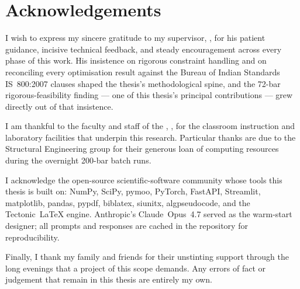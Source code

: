 \chapter*{Acknowledgements}

I wish to express my sincere gratitude to my supervisor,
\thesisguide, for his patient guidance, incisive technical
feedback, and steady encouragement across every phase of this
work. His insistence on rigorous constraint handling and on
reconciling every optimisation result against the Bureau of
Indian Standards IS~800:2007 clauses shaped the thesis's
methodological spine, and the 72-bar rigorous-feasibility
finding --- one of this thesis's principal contributions ---
grew directly out of that insistence.

I am thankful to the faculty and staff of the
\thesisdepartment, \thesisinstitute, for the classroom
instruction and laboratory facilities that underpin this
research. Particular thanks are due to the Structural
Engineering group for their generous loan of computing
resources during the overnight 200-bar batch runs.

I acknowledge the open-source scientific-software community
whose tools this thesis is built on: NumPy, SciPy, pymoo,
PyTorch, FastAPI, Streamlit, matplotlib, pandas, pypdf,
biblatex, siunitx, algpseudocode, and the Tectonic~LaTeX
engine. Anthropic's Claude~Opus~4.7 served as the warm-start
designer; all prompts and responses are cached in the
repository for reproducibility.

Finally, I thank my family and friends for their unstinting
support through the long evenings that a project of this scope
demands. Any errors of fact or judgement that remain in this
thesis are entirely my own.

\vspace{2cm}
\hfill \thesisauthor

\clearpage
